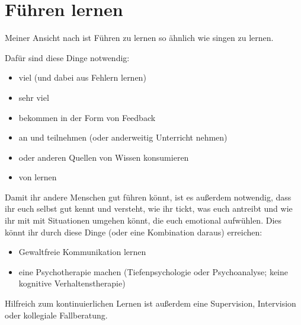 \section{Führen lernen}
\label{fuehren-lernen}
\label{fuehrung-lernen}

Meiner Ansicht nach ist Führen zu lernen so ähnlich wie singen zu lernen.

Dafür sind diese Dinge notwendig:

\begin{itemize}
  \item viel  (und dabei aus Fehlern lernen)
  \item sehr viel  
  \item {} bekommen in der Form von Feedback  
  \item an  und  teilnehmen (oder anderweitig Unterricht nehmen)
  \item {} oder anderen Quellen von Wissen konsumieren
  \item von  lernen
\end{itemize}

Damit ihr andere Menschen gut führen könnt, ist es außerdem notwendig, dass ihr euch selbst gut kennt und versteht, wie ihr tickt, was euch antreibt und wie ihr mit mit Situationen umgehen könnt, die euch emotional aufwühlen. Dies könnt ihr durch diese Dinge (oder eine Kombination daraus) erreichen:

\begin{itemize}
  \item Gewaltfreie Kommunikation lernen 
  \item eine Psychotherapie machen (Tiefenpsychologie oder Psychoanalyse; keine kognitive Verhaltenstherapie) 
\end{itemize}

Hilfreich zum kontinuierlichen Lernen ist außerdem eine Supervision, Intervision oder kollegiale Fallberatung.
